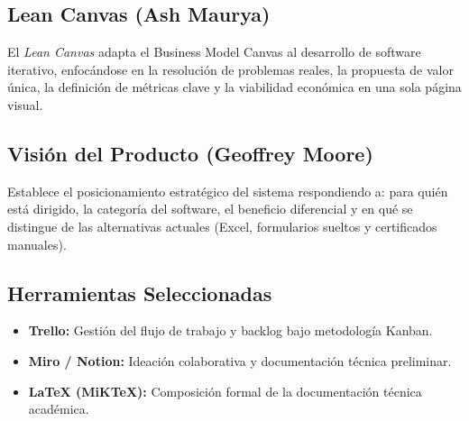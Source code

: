 \subsection{Lean Canvas (Ash Maurya)}
El \textit{Lean Canvas} adapta el Business Model Canvas al desarrollo de software iterativo, enfocándose en la resolución de problemas reales, la propuesta de valor única, la definición de métricas clave y la viabilidad económica en una sola página visual.

\subsection{Visión del Producto (Geoffrey Moore)}
Establece el posicionamiento estratégico del sistema respondiendo a: para quién está dirigido, la categoría del software, el beneficio diferencial y en qué se distingue de las alternativas actuales (Excel, formularios sueltos y certificados manuales).

\subsection{Herramientas Seleccionadas}
\begin{itemize}
    \item \textbf{Trello:} Gestión del flujo de trabajo y backlog bajo metodología Kanban.
    \item \textbf{Miro / Notion:} Ideación colaborativa y documentación técnica preliminar.
    \item \textbf{\LaTeX{} (MiKTeX):} Composición formal de la documentación técnica académica.
\end{itemize}
